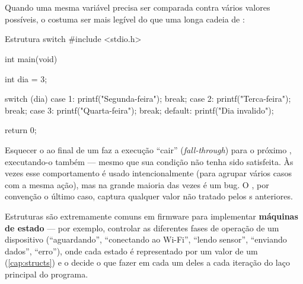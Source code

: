 \section{}

Quando uma mesma variável precisa ser comparada contra vários valores possíveis, o  costuma ser mais legível do que uma longa cadeia de :

\begin{codigoc}{Estrutura switch}
#include <stdio.h>

int main(void) {
    int dia = 3;

    switch (dia) {
        case 1:
            printf("Segunda-feira\n");
            break;
        case 2:
            printf("Terca-feira\n");
            break;
        case 3:
            printf("Quarta-feira\n");
            break;
        default:
            printf("Dia invalido\n");
    }

    return 0;
}
\end{codigoc}

\begin{atencao}
Esquecer o  ao final de um  faz a execução ``cair'' (\emph{fall-through}) para o próximo , executando-o também — mesmo que sua condição não tenha sido satisfeita. Às vezes esse comportamento é usado intencionalmente (para agrupar vários casos com a mesma ação), mas na grande maioria das vezes é um bug. O , por convenção o último caso, captura qualquer valor não tratado pelos s anteriores.
\end{atencao}

\begin{esp32box}
Estruturas  são extremamente comuns em firmware para implementar \textbf{máquinas de estado} — por exemplo, controlar as diferentes fases de operação de um dispositivo (``aguardando'', ``conectando ao Wi-Fi'', ``lendo sensor'', ``enviando dados'', ``erro''), onde cada estado é representado por um valor de um  (\cref{cap:structs}) e o  decide o que fazer em cada um deles a cada iteração do laço principal do programa.
\end{esp32box}
